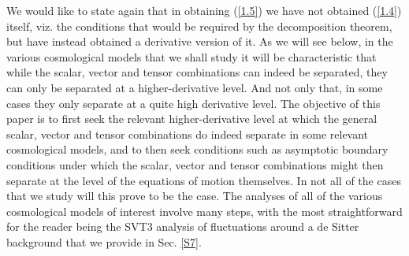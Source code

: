 \documentclass[aps,onecolumn,10pt]{revtex4}
\numberwithin{equation}{section}
\numberwithin{equation}{section}
\begin{document}
We would like to state again that in obtaining (\ref{1.5}) we have not obtained (\ref{1.4}) itself, viz. the conditions that would be required by the decomposition theorem, but have instead obtained a derivative version of it. As we will see below, in the various cosmological models that we shall study it will be characteristic that while the scalar, vector and tensor combinations can indeed be separated, they can only be separated at a higher-derivative level. And not only that, in some cases they only separate at a quite high derivative level. The objective of this paper is to first seek the relevant higher-derivative level at which the general scalar, vector and tensor combinations do indeed separate in some relevant cosmological models, and to then seek conditions such as asymptotic boundary conditions under which the scalar, vector and tensor combinations might then separate at the level of the equations of motion themselves. In not all of the cases that we study will this prove to be the case. The analyses of all of the various cosmological models of interest involve many steps, with the most straightforward for the reader being the SVT3 analysis of fluctuations around a de Sitter background that we provide in Sec. \ref{S7}. 
\end{document}

